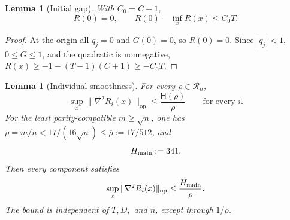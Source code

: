 \documentclass{article}
\newtheorem{lemma}[theorem]{Lemma}
\theoremstyle{definition}
\newcommand{\op}{\mathrm{op}}
\begin{document}
\begin{lemma}[Initial gap]
\label{lem:uniform-gap}
With $C_0=C+1$,
\begin{equation}
    R(0)=0,
    \qquad R(0)-\inf_xR(x)\le C_0T.
    \label{eq:uniform-gap}
\end{equation}
\end{lemma}

\begin{proof}
At the origin all $q_j=0$ and $G(0)=0$, so $R(0)=0$.  Since $|q_j|<1$, $0\le G\le1$, and the quadratic is nonnegative,
$R(x)\ge-1-(T-1)(C+1)\ge-C_0T$.
\end{proof}

\begin{lemma}[Individual smoothness]
\label{lem:uniform-smoothness}
For every $\rho\in\mathcal R_n$,
\begin{equation}
 \sup_x\|\nabla^2R_i(x)\|_{\op}
 \le\frac {\mathsf H(\rho)}\rho
 \qquad\text{for every }i.
 \label{eq:general-component-smoothness}
\end{equation}
For the least parity-compatible $m\ge\sqrt n$, one has
$\rho=m/n<17/(16\sqrt n)\le\overline\rho:=17/512$, and
\begin{equation}
 H_{\rm main}:=341.
 \label{eq:explicit-component-H}
\end{equation}
Then every component satisfies
\begin{equation}
 \sup_x\|\nabla^2R_i(x)\|_{\op}
 \le\frac {H_{\rm main}}\rho.
 \label{eq:uniform-component-smoothness}
\end{equation}
The bound is independent of $T,D,$ and $n$, except through $1/\rho$.
\end{lemma}
\end{document}

